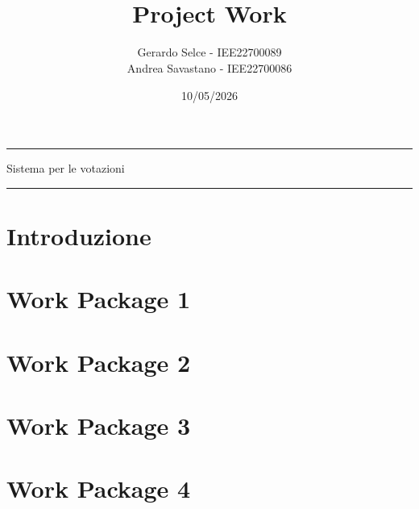 \documentclass[11pt]{article}
\begin{document}
	\setlength{\parindent}{0pt}
	\title{\vspace{-4em}{\large Algoritmi e Protocolli per la Sicurezza} \\
		Project Work}
	\author{Gerardo Selce - IEE22700089 \\
			Andrea Savastano - IEE22700086}
	\date{10/05/2026}
	\maketitle
	
	\vspace{-2em}\par\noindent\rule{\textwidth}{0.4pt}
	\begin{center}
		{\Large\sc Sistema per le votazioni}
	\end{center}
	\par\noindent\rule{\textwidth}{0.4pt}
	
	
	
	\tableofcontents
	\newpage
	
	\section*{Introduzione}
	
	
	\newpage
	\section{Work Package 1}
	
	
	\newpage
	\section{Work Package 2}
	
	
	\newpage
	\section{Work Package 3}
	
	
	\newpage
	\section{Work Package 4}
	

	
\end{document}
